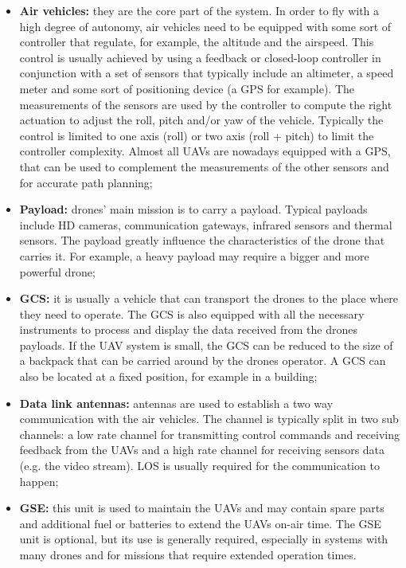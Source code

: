 \begin{itemize}
	\item \textbf{Air vehicles:} they are the core part of the system. In order to fly with a high degree of autonomy, air vehicles need to be equipped with some sort of controller that regulate, for example, the altitude and the airspeed. This control is usually achieved by using a feedback or closed-loop controller in conjunction with a set of sensors that typically include an altimeter, a speed meter and some sort of positioning device (a GPS for example). The measurements of the sensors are used by the controller to compute the right actuation to adjust the roll, pitch and/or yaw of the vehicle. Typically the control is limited to one axis (roll) or two axis (roll + pitch) to limit the controller complexity. Almost all \glspl{UAV} are nowadays equipped with a GPS, that can be used to complement the measurements of the other sensors and for accurate path planning;
	
	\item \textbf{Payload:} drones' main mission is to carry a payload. Typical payloads include HD cameras, communication gateways, infrared sensors and thermal sensors. The payload greatly influence the characteristics of the drone that carries it. For example, a heavy payload may require a bigger and more powerful drone;
	
	\item \textbf{\gls{GCS}:} it is usually a vehicle that can transport the drones to the place where they need to operate. The \gls{GCS} is also equipped with all the necessary instruments to process and display the data received from the drones payloads. If the \gls{UAV} system is small, the \gls{GCS} can be reduced to the size of a backpack that can be carried around by the drones operator. A \gls{GCS} can also be located at a fixed position, for example in a building;
	
	\item \textbf{Data link antennas:} antennas are used to establish a two way communication with the air vehicles. The channel is typically split in two sub channels: a low rate channel for transmitting control commands and receiving feedback from the \glspl{UAV} and a high rate channel for receiving sensors data (e.g. the video stream). \gls{LOS} is usually required for the communication to happen;
	
	\item \textbf{\gls{GSE}:} this unit is used to maintain the \glspl{UAV} and may contain spare parts and additional fuel or batteries to extend the \glspl{UAV} on-air time. The \gls{GSE} unit is optional, but its use is generally required, especially in systems with many drones and for missions that require extended operation times.
	
\end{itemize}

